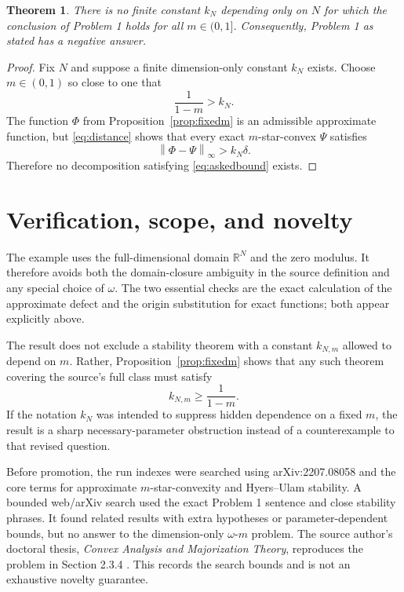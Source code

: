 \documentclass[11pt]{article}
\newcommand{\R}{\mathbb R}
\newcommand{\norm}[1]{\left\lVert#1\right\rVert}
\newtheorem{theorem}{Theorem}
\begin{document}
\begin{theorem}\label{thm:main}
There is no finite constant \(k_N\) depending only on \(N\) for which the
conclusion of Problem 1 holds for all \(m\in(0,1]\).  Consequently, Problem 1
as stated has a negative answer.
\end{theorem}

\begin{proof}
Fix \(N\) and suppose a finite dimension-only constant \(k_N\) exists.  Choose
\(m\in(0,1)\) so close to one that
\[
 \frac{1}{1-m}>k_N.
\]
The function \(\Phi\) from Proposition~\ref{prop:fixedm} is an admissible
approximate function, but \eqref{eq:distance} shows that every exact
\(m\)-star-convex \(\Psi\) satisfies
\[
 \norm{\Phi-\Psi}_\infty>k_N\delta.
\]
Therefore no decomposition satisfying \eqref{eq:askedbound} exists.
\end{proof}

\section{Verification, scope, and novelty}

The example uses the full-dimensional domain \(\R^N\) and the zero modulus.
It therefore avoids both the domain-closure ambiguity in the source definition
and any special choice of \(\omega\).  The two essential checks are the exact
calculation of the approximate defect and the origin substitution for exact
functions; both appear explicitly above.

The result does not exclude a stability theorem with a constant
\(k_{N,m}\) allowed to depend on \(m\).  Rather, Proposition~\ref{prop:fixedm}
shows that any such theorem covering the source's full class must satisfy
\[
 k_{N,m}\geq\frac{1}{1-m}.
\]
If the notation \(k_N\) was intended to suppress hidden dependence on a fixed
\(m\), the result is a sharp necessary-parameter obstruction instead of a
counterexample to that revised question.

Before promotion, the run indexes were searched using arXiv:2207.08058 and
the core terms for approximate \(m\)-star-convexity and Hyers--Ulam stability.
A bounded web/arXiv search used the exact Problem 1 sentence and close
stability phrases.  It found related results with extra hypotheses or
parameter-dependent bounds, but no answer to the dimension-only
\(\omega\)-\(m\) problem.  The source author's doctoral thesis,
\emph{Convex Analysis and Majorization Theory}, reproduces the problem in
Section 2.3.4 \cite{Thesis}.  This records the search bounds and is not an
exhaustive novelty guarantee.
\end{document}
